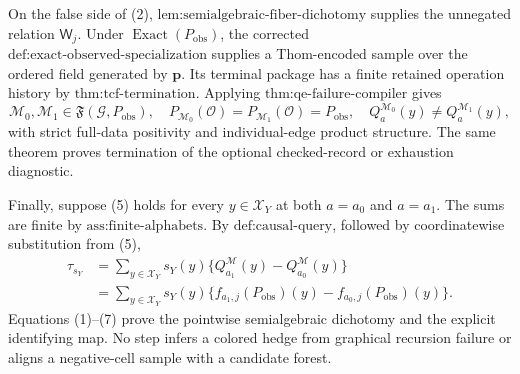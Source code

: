 On the false side of (2), \(\text{lem:semialgebraic-fiber-dichotomy}\) supplies the unnegated relation \(\mathsf W_j\). Under \(\operatorname{Exact}(P_{\mathrm{obs}})\), the corrected \(\text{def:exact-observed-specialization}\) supplies a Thom-encoded sample over the ordered field generated by \(\mathbf p\). Its terminal package has a finite retained operation history by \(\text{thm:tcf-termination}\). Applying \(\text{thm:qe-failure-compiler}\) gives
\[
\mathcal M_0,\mathcal M_1\in\mathfrak F(\mathcal G,P_{\mathrm{obs}}),
\quad
P_{\mathcal M_0}(\mathcal O)=P_{\mathcal M_1}(\mathcal O)=P_{\mathrm{obs}},
\quad
Q_a^{\mathcal M_0}(y)\neq Q_a^{\mathcal M_1}(y),
\tag{6}
\]
with strict full-data positivity and individual-edge product structure. The same theorem proves termination of the optional checked-record or exhaustion diagnostic.

Finally, suppose (5) holds for every \(y\in\mathcal X_Y\) at both \(a=a_0\) and \(a=a_1\). The sums are finite by \(\text{ass:finite-alphabets}\). By \(\text{def:causal-query}\), followed by coordinatewise substitution from (5),
\[
\begin{aligned}
\tau_{s_Y}
&=\sum_{y\in\mathcal X_Y}s_Y(y)
\{Q_{a_1}^{\mathcal M}(y)-Q_{a_0}^{\mathcal M}(y)\}\\
&=\sum_{y\in\mathcal X_Y}s_Y(y)
\{f_{a_1,j}(P_{\mathrm{obs}})(y)-f_{a_0,j}(P_{\mathrm{obs}})(y)\}.
\end{aligned}
\tag{7}
\]
Equations (1)--(7) prove the pointwise semialgebraic dichotomy and the explicit identifying map. No step infers a colored hedge from graphical recursion failure or aligns a negative-cell sample with a candidate forest.
